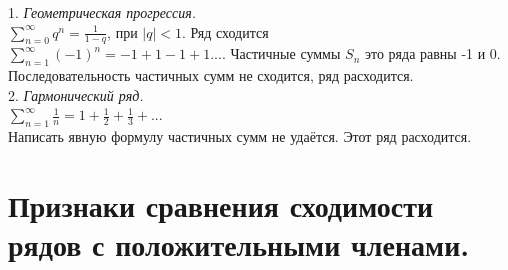 1. \textit{Геометрическая прогрессия.} \\
$\sum_{n=0}^{\infty} q^n = \frac{1}{1 - q}$, при $|q| < 1$. Ряд сходится \\
$\sum_{n=1}^{\infty} (-1)^n = - 1 + 1 - 1 + 1 ...$. Частичные суммы $S_n$ это ряда равны -1 и 0. Последовательность частичных сумм не сходится, ряд расходится.\\
2. \textit{Гармонический ряд.} \\
$\sum_{n=1}^{\infty} \frac{1}{n} = 1 + \frac{1}{2} + \frac{1}{3} + ...$\\
Написать явную формулу частичных сумм не удаётся. Этот ряд расходится.\\



\section{Признаки сравнения сходимости рядов с положительными членами.}


